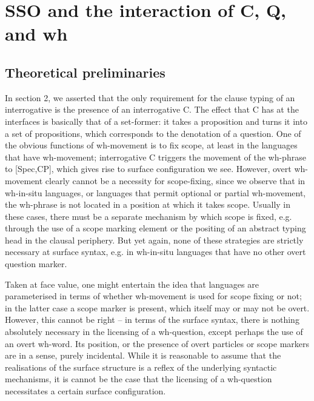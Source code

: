 \documentclass[charis]{glossa}
\begin{document}
\section{SSO and the interaction of C, Q, and wh}
\subsection{Theoretical preliminaries}
In section 2, we asserted that the only requirement for the clause typing of an interrogative is the presence of an interrogative C. The effect that C has at the interfaces is basically that of a set-former: it takes a proposition and turns it into a set of propositions, which corresponds to the denotation of a question. One of the obvious functions of wh-movement is to fix scope, at least in the languages that have wh-movement; interrogative C triggers the movement of the wh-phrase to [Spec,CP], which gives rise to surface configuration we see. However, overt wh-movement clearly cannot be a necessity for scope-fixing, since we observe that in wh-in-situ languages, or languages that permit optional or partial wh-movement, the wh-phrase is not located in a position at which it takes scope. Usually in these cases, there must be a separate mechanism by which scope is fixed, e.g. through the use of a scope marking element or the positing of an abstract typing head in the clausal periphery. But yet again, none of these strategies are strictly necessary at surface syntax, e.g. in wh-in-situ languages that have no other overt question marker.

Taken at face value, one might entertain the idea that languages are parameterised in terms of whether wh-movement is used for scope fixing or not; in the latter case a scope marker is present, which itself may or may not be overt. However, this cannot be right -- in terms of the surface syntax, there is nothing absolutely necessary in the licensing of a wh-question, except perhaps the use of an overt wh-word. Its position, or the presence of overt particles or scope markers are in a sense, purely incidental. While it is reasonable to assume that the realisations of the surface structure is a reflex of the underlying syntactic mechanisms, it is cannot be the case that the licensing of a wh-question necessitates a certain surface configuration.
\end{document}
